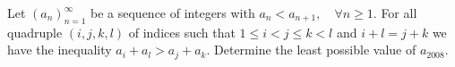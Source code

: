 Let $ (a_n)^{\infty}_{n=1}$ be a sequence of integers with $ a_{n} < a_{n+1}, \quad \forall n \geq 1.$ For all quadruple $ (i,j,k,l)$ of indices such that $ 1 \leq i < j \leq k < l$ and $ i + l = j + k$ we have the inequality $ a_{i} + a_{l} > a_{j} + a_{k}.$ Determine the least possible value of $ a_{2008}.$